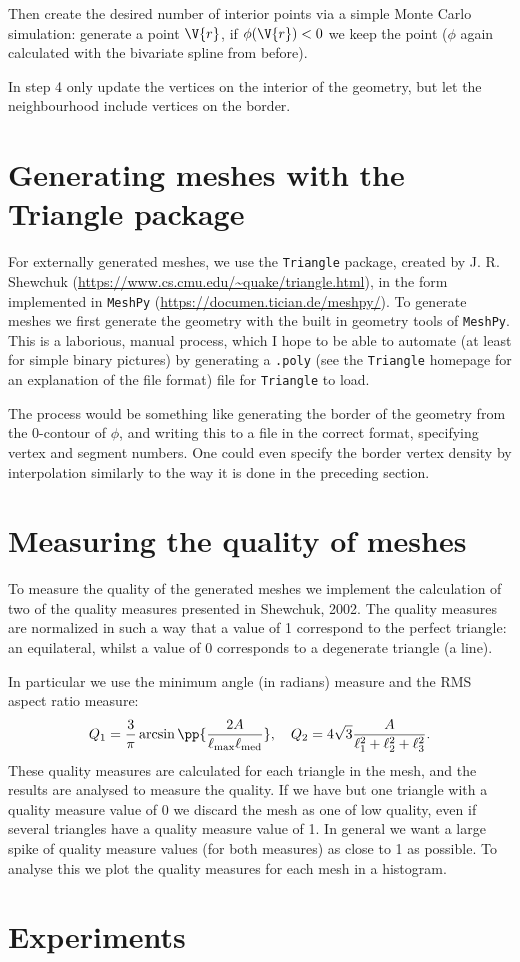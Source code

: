 \documentclass[sigconf]{acmart}
\begin{document}
Then create the desired number of interior points via a simple Monte Carlo simulation: generate a point $ \V{r} $, if $ \phi(\V{r}) < 0 $ we keep the point ($ \phi $ again calculated with the bivariate spline from before).

In step 4 only update the vertices on the interior of the geometry, but let the neighbourhood include vertices on the border.


\section{Generating meshes with the Triangle package}
For externally generated meshes, we use the \texttt{Triangle} package, created by J. R. Shewchuk (\url{https://www.cs.cmu.edu/~quake/triangle.html}), in the form implemented in \texttt{MeshPy} (\url{https://documen.tician.de/meshpy/}). To generate meshes we first generate the geometry with the built in geometry tools of \texttt{MeshPy}. This is a laborious, manual process, which I hope to be able to automate (at least for simple binary pictures) by generating a \texttt{.poly} (see the \texttt{Triangle} homepage for an explanation of the file format) file for \texttt{Triangle} to load.

The process would be something like generating the border of the geometry from the 0-contour of $ \phi $, and writing this to a file in the correct format, specifying vertex and segment numbers. One could even specify the border vertex density by interpolation similarly to the way it is done in the preceding section.




\section{Measuring the quality of meshes}
To measure the quality of the generated meshes we implement the calculation of two of the quality measures presented in Shewchuk, 2002. The quality measures are normalized in such a way that a value of 1 correspond to the perfect triangle: an equilateral, whilst a value of 0 corresponds to a degenerate triangle (a line).

In particular we use the minimum angle (in radians) measure and the RMS aspect ratio measure:
\begin{equation}\label{key}
	Q_1 = \frac{3}{\pi} \arcsin\pp{\frac{2A}{\ell_{\text{max}} \ell_{\text{med}}}}, \quad Q_2 = 4 \sqrt{3} \frac{A}{\ell_1^2 + \ell_2^2 + \ell_3^2}. 
\end{equation}
These quality measures are calculated for each triangle in the mesh, and the results are analysed to measure the quality. If we have but one triangle with a quality measure value of 0 we discard the mesh as one of low quality, even if several triangles have a quality measure value of 1. In general we want a large spike of quality measure values (for both measures) as close to 1 as possible. To analyse this we plot the quality measures for each mesh in a histogram.

\section{Experiments}
\end{document}
